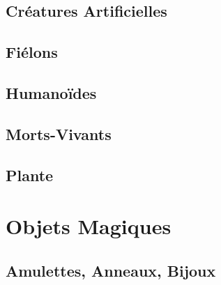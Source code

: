 \documentclass{dd}
\begin{document}


\section{Créatures Artificielles}









\section{Fiélons}




\section{Humanoïdes}









\section{Morts-Vivants}







\section{Plante}


\chapter{Objets Magiques}

\section{Amulettes, Anneaux, Bijoux} \label{bijoux}

\end{document}

